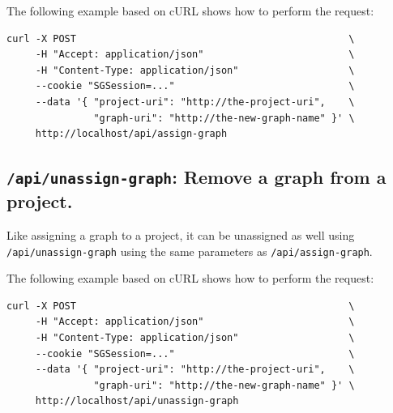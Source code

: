   The following example based on cURL shows how to perform the request:
\begin{siderules}
\begin{verbatim}
curl -X POST                                               \
     -H "Accept: application/json"                         \
     -H "Content-Type: application/json"                   \
     --cookie "SGSession=..."                              \
     --data '{ "project-uri": "http://the-project-uri",    \
               "graph-uri": "http://the-new-graph-name" }' \
     http://localhost/api/assign-graph
\end{verbatim}
\end{siderules}

\subsection{\texttt{/api/unassign-graph}: Remove a graph from a project.}

  Like assigning a graph to a project, it can be unassigned as well using
  \texttt{/api/unassign-graph} using the same parameters as
  \texttt{/api/assign-graph}.

  The following example based on cURL shows how to perform the request:
\begin{siderules}
\begin{verbatim}
curl -X POST                                               \
     -H "Accept: application/json"                         \
     -H "Content-Type: application/json"                   \
     --cookie "SGSession=..."                              \
     --data '{ "project-uri": "http://the-project-uri",    \
               "graph-uri": "http://the-new-graph-name" }' \
     http://localhost/api/unassign-graph
\end{verbatim}
\end{siderules}
